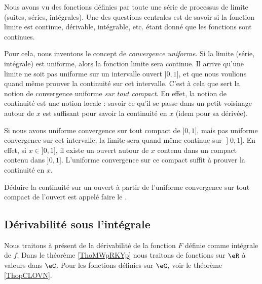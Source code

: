 \begin{normaltext}      \label{NORMooZWECooHvRgBw}

	Nous avons vu des fonctions définies par toute une série de processus de limite (suites, séries, intégrales). Une des questions centrales est de savoir si la fonction limite est continue, dérivable, intégrable, etc. étant donné que les fonctions sont continues.

	Pour cela, nous inventons le concept de \emph{convergence uniforme}. Si la limite (série, intégrale) est uniforme, alors la fonction limite sera continue. Il arrive qu'une limite ne soit pas uniforme sur un intervalle ouvert \( ]0,1]\), et que nous voulions quand même prouver la continuité sur cet intervalle. C'est à cela que sert la notion de convergence uniforme \emph{sur tout compact}. En effet, la notion de continuité est une notion locale : savoir ce qu'il se passe dans un petit voisinage autour de \( x\) est suffisant pour savoir la continuité en \( x\) (idem pour sa dérivée).

	Si nous avons uniforme convergence sur tout compact de \( ]0,1]\), mais pas uniforme convergence sur cet intervalle, la limite sera quand même continue sur \( \mathopen] 0 , 1 \mathclose]\). En effet, si \( x\in]0,1]\), il existe un ouvert autour de \( x\) contenu dans un compact contenu dans \( ]0,1]\). L'uniforme convergence sur ce compact suffit à prouver la continuité en \( x\).

	Déduire la continuité sur un ouvert à partir de l'uniforme convergence sur tout compact de l'ouvert est appelé faire le .
\end{normaltext}

\subsection{Dérivabilité sous l'intégrale}

Nous traitons à présent de la dérivabilité de la fonction \( F\) définie comme intégrale de \( f\). Dans le théorème \ref{ThoMWpRKYp} nous traitons de fonctions sur \( \eR\) à valeurs dans \( \eC\). Pour les fonctions définies sur \( \eC\), voir le théorème \ref{ThopCLOVN}.


